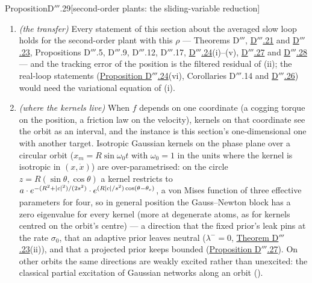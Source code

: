 \begin{thm}{Proposition}{D$'''$.29}[second-order plants: the sliding-variable
reduction]
\begin{enumerate}[label=\textup{(\roman*)}]
    $n$-th harmonic, and is the better prediction where that term dominates (a small residual of high frequency).
  \item \emph{(the transfer)} Every statement of this section about the averaged slow loop holds for the second-order
    plant with this $\rho$ --- Theorems D$'''$, \hyperref[res:thmDppp:21]{D$'''$.21} and
    \hyperref[res:thmDppp:23]{D$'''$.23}, Propositions D$'''$.5, D$'''$.9, D$'''$.12, D$'''$.17,
    \hyperref[res:thmDppp:24]{D$'''$.24}(i)--(v), \hyperref[res:thmDppp:27]{D$'''$.27} and
    \hyperref[res:thmDppp:28]{D$'''$.28} --- and the tracking error of the position is the filtered residual of (ii);
    the real-loop statements (\hyperref[res:thmDppp:24]{Proposition D$'''$.24}(vi), Corollaries D$'''$.14 and
    \hyperref[res:thmDppp:26]{D$'''$.26}) would need the variational equation of (i).
  \item \emph{(where the kernels live)} When $f$ depends on one coordinate (a cogging torque on the position, a
    friction law on the velocity), kernels on that coordinate see the orbit as an interval, and the instance is this
    section's one-dimensional one with another target. Isotropic Gaussian kernels on the phase plane over a circular
    orbit ($x_m = R\sin\omega_0t$ with $\omega_0 = 1$ in the units where the kernel is isotropic in $(x,\dot x)$) are
    over-parametrised: on the circle $z = R(\sin\theta,\cos\theta)$ a kernel restricts to
    $a\cdot e^{-(R^2 + \lvert c\rvert^2)/(2s^2)}\cdot e^{(R\lvert c\rvert/s^2)\cos(\theta - \theta_c)}$, a von Mises function of
    three effective parameters for four, so in general position the Gauss--Newton block has a zero eigenvalue for
    every kernel (more at degenerate atoms, as for kernels centred on the orbit's centre) --- a direction that the
    fixed prior's leak pins at the rate $\sigma_0$, that an adaptive prior leaves neutral ($\lambda^- = 0$,
    \hyperref[res:thmDppp:23]{Theorem D$'''$.23}(ii)), and that a projected prior keeps bounded
    (\hyperref[res:thmDppp:27]{Proposition D$'''$.27}). On other orbits the same directions are weakly excited rather
    than unexcited: the classical partial excitation of Gaussian networks along an orbit (\cite{R6,R7,R8}).
\end{enumerate}
\end{thm}


